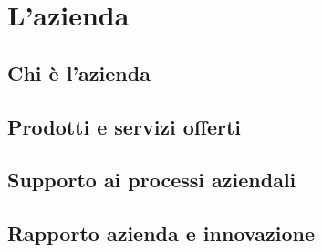 
\chapter{L'azienda}
\label{cap:azienda}


\section{Chi è l'azienda}


\section{Prodotti e servizi offerti}


\section{Supporto ai processi aziendali}


\section{Rapporto azienda e innovazione}
